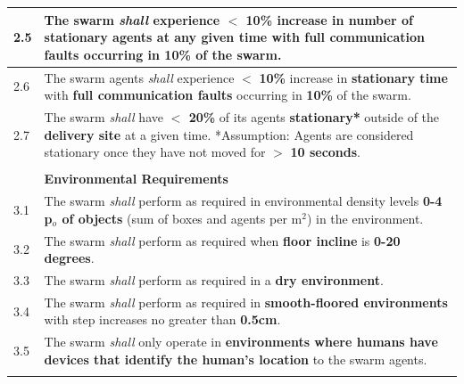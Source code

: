 \documentclass{article}
\begin{document}
\begin{table}[!t]
\begin{tabular}{p{5mm} p{140mm} }
\hline
2.5 & The swarm \emph{shall} experience $<$ \textbf{10\%} increase in \textbf{number of stationary agents} at any given time with \textbf{full communication faults} occurring in \textbf{10\%} of the swarm.\\
\hline
2.6 & The swarm agents \emph{shall} experience $<$ \textbf{10\%} increase in \textbf{stationary time} with \textbf{full communication faults} occurring in \textbf{10\%} of the swarm. \\	
\hline
2.7 & The swarm \emph{shall} have \textbf{$<$ 20\%} of its agents \textbf{stationary*} outside of the \textbf{delivery site} at a given time.
*Assumption: Agents are considered stationary once they have not moved for $>$ \textbf{10 seconds}. \\ 
\hline \\[-1.25\medskipamount]
& \textbf{Environmental Requirements} \\ 
\hline
3.1 & The swarm \emph{shall} perform as required in environmental density levels \textbf{0-4 p$_o$ of objects} (sum of boxes and agents per m$^2$) in the environment. 
\\ 
\hline
3.2 & The swarm \emph{shall} perform as required when \textbf{floor incline} is \textbf{0-20 degrees}.
\\ 
\hline
3.3 & The swarm \emph{shall} perform as required in a \textbf{dry environment}.
\\ 
\hline
3.4 & The swarm \emph{shall} perform as required in \textbf{smooth-floored environments} with step increases no greater than \textbf{0.5cm}.
\\ 
\hline
3.5 & The swarm \emph{shall} only operate in \textbf{environments where humans have devices that identify the human’s location} to the swarm agents. 
\\ 		
\hline \\[-1\medskipamount]
\end{tabular}
\end{table}
\end{document}
